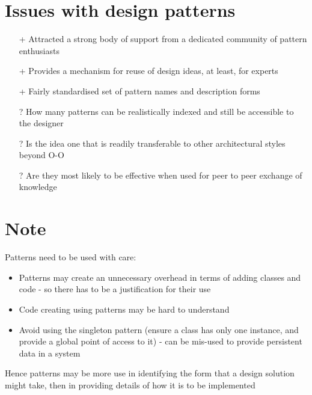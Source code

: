 \documentclass{article}[18pt]
\begin{document}
\section{Issues with design patterns}
\begin{itemize}
	\item [+] Attracted a strong body of support from a dedicated community of pattern enthusiasts
	\item [+] Provides a mechanism for reuse of design ideas, at least, for experts
	\item [+] Fairly standardised set of pattern names and description forms 
	\item [?] How many patterns can be realistically indexed and still be accessible to the designer
	\item [?] Is the idea one that is readily transferable to other architectural styles beyond O-O
	\item [?] Are they most likely to be effective when used for peer to peer exchange of knowledge
\end{itemize}
\section{Note}
Patterns need to be used with care:
\begin{itemize}
	\item Patterns may create an unnecessary overhead in terms of adding classes and code - so there has to be a justification for their use
	\item Code creating using patterns may be hard to understand
	\item Avoid using the singleton pattern (ensure a class has only one instance, and provide a global point of access to it) - can be mis-used to provide persistent data in a system
\end{itemize}
Hence patterns may be more use in identifying the form that a design solution might take, then in providing details of how it is to be implemented
\end{document}
